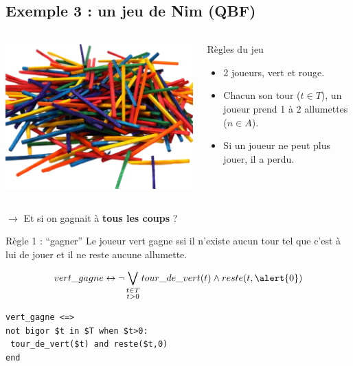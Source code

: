 \documentclass[english,french,usenames,dvipsnames]{beamer}
\begin{document}
\subsection{Exemple 3 : un jeu de Nim (QBF)}

\begin{frame}{\subsecname}
\begin{columns}[T]
\begin{column}{0.3\textwidth}
\includegraphics[width=1\textwidth]{figures/allumettes.png}
\end{column}
\begin{column}{0.7\textwidth}
\begin{exampleblock}{Règles du jeu}
\begin{itemize}
\item 2 joueurs, {\color{ForestGreen}vert} et {\color{red}rouge}.
\item Chacun son tour ($t \in T$), un joueur prend 1 à 2 allumettes ($n \in A$).
\item Si un joueur ne peut plus jouer, il a perdu.
\end{itemize}
\end{exampleblock}
\end{column}
\end{columns}
\begin{center}
$\longrightarrow$ Et si on gagnait à \textbf{tous les coups} ?    
\end{center}
\end{frame}

\begin{frame}[containsverbatim]{\subsecname}
\begin{exampleblock}{Règle 1 : \enquote{gagner}}
Le {\color{ForestGreen}joueur vert} gagne ssi il n'existe aucun tour tel que c'est à lui de jouer et il ne reste aucune allumette.
\end{exampleblock}
\[
vert\_gagne \leftrightarrow \neg \bigvee_{\substack{t \in T\\t > 0}}
tour\_de\_vert(t) \wedge reste(t,\alert{0})
\]
\begin{verbatim}
vert_gagne <=>
not bigor $t in $T when $t>0:
 tour_de_vert($t) and reste($t,0)
end
\end{verbatim}
\end{frame}
\end{document}
